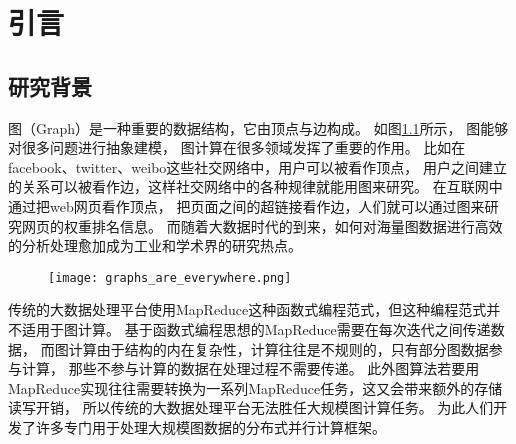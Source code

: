 \chapter{引言}
\section{研究背景}

图（Graph）是一种重要的数据结构，它由顶点与边构成。
如图\ref{fig:graph_important}所示，
图能够对很多问题进行抽象建模，
图计算在很多领域发挥了重要的作用。
比如在facebook、twitter、weibo这些社交网络中，用户可以被看作顶点，
用户之间建立的关系可以被看作边，这样社交网络中的各种规律就能用图来研究。
在互联网中通过把web网页看作顶点，
把页面之间的超链接看作边，人们就可以通过图来研究网页的权重排名信息。
而随着大数据时代的到来，如何对海量图数据进行高效的分析处理愈加成为工业和学术界的研究热点。

\begin{figure}[!htbp]
  \centering
  \texttt{[image: graphs\_are\_everywhere.png]}
  \label{fig:graph_important}
\end{figure}

传统的大数据处理平台使用MapReduce\cite{mapreduce}这种函数式编程范式，但这种编程范式并不适用于图计算。
基于函数式编程思想的MapReduce需要在每次迭代之间传递数据，
而图计算由于结构的内在复杂性，计算往往是不规则的，只有部分图数据参与计算，
那些不参与计算的数据在处理过程不需要传递。
此外图算法若要用MapReduce实现往往需要转换为一系列MapReduce任务，这又会带来额外的存储读写开销，
所以传统的大数据处理平台无法胜任大规模图计算任务\cite{Malewicz@SIGMOD10}。
为此人们开发了许多专门用于处理大规模图数据的分布式并行计算框架。    
\cite{Malewicz@SIGMOD10, Low@12, Gonzalez@OSDI12, Zhu@OSDI16, Gonzalez@OSDI14, Avery@HS11, Shao@SIGMOD13, 
Chen@EuroSys15, Xie@PPoPP15, Roy@SOSP15, Seo@CloudCom10, Gregor@POOSC15, Hoque@TRIOS13, Teixeira@SOSP15}

